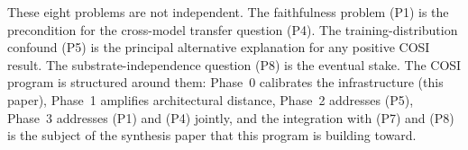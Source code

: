 These eight problems are not independent. The faithfulness problem (P1)
is the precondition for the cross-model transfer question (P4). The
training-distribution confound (P5) is the principal alternative
explanation for any positive COSI result. The substrate-independence
question (P8) is the eventual stake. The COSI program is structured
around them: Phase~0 calibrates the infrastructure (this paper),
Phase~1 amplifies architectural distance, Phase~2 addresses (P5),
Phase~3 addresses (P1) and (P4) jointly, and the integration with (P7)
and (P8) is the subject of the synthesis paper that this program is
building toward.
